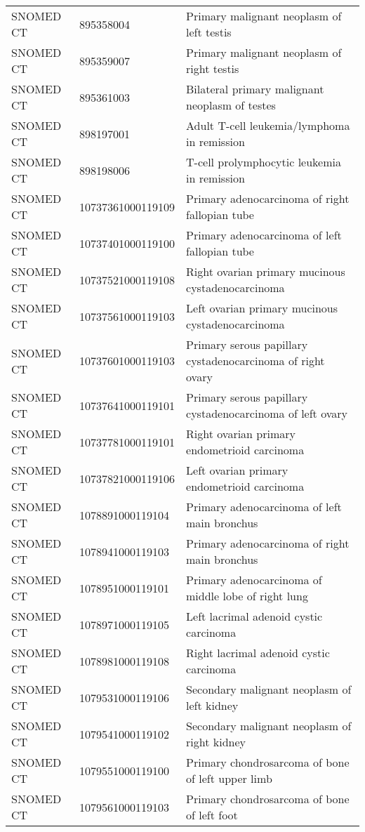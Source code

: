 \begin{longtable}{p{}p{}p{}}
  SNOMED CT & 895358004 & Primary malignant neoplasm of left testis \\ 
  SNOMED CT & 895359007 & Primary malignant neoplasm of right testis \\ 
  SNOMED CT & 895361003 & Bilateral primary malignant neoplasm of testes \\ 
  SNOMED CT & 898197001 & Adult T-cell leukemia/lymphoma in remission \\ 
  SNOMED CT & 898198006 & T-cell prolymphocytic leukemia in remission \\ 
  SNOMED CT & 10737361000119109 & Primary adenocarcinoma of right fallopian tube \\ 
  SNOMED CT & 10737401000119100 & Primary adenocarcinoma of left fallopian tube \\ 
  SNOMED CT & 10737521000119108 & Right ovarian primary mucinous cystadenocarcinoma \\ 
  SNOMED CT & 10737561000119103 & Left ovarian primary mucinous cystadenocarcinoma \\ 
  SNOMED CT & 10737601000119103 & Primary serous papillary cystadenocarcinoma of right ovary \\ 
  SNOMED CT & 10737641000119101 & Primary serous papillary cystadenocarcinoma of left ovary \\ 
  SNOMED CT & 10737781000119101 & Right ovarian primary endometrioid carcinoma \\ 
  SNOMED CT & 10737821000119106 & Left ovarian primary endometrioid carcinoma \\ 
  SNOMED CT & 1078891000119104 & Primary adenocarcinoma of left main bronchus \\ 
  SNOMED CT & 1078941000119103 & Primary adenocarcinoma of right main bronchus \\ 
  SNOMED CT & 1078951000119101 & Primary adenocarcinoma of middle lobe of right lung \\ 
  SNOMED CT & 1078971000119105 & Left lacrimal adenoid cystic carcinoma \\ 
  SNOMED CT & 1078981000119108 & Right lacrimal adenoid cystic carcinoma \\ 
  SNOMED CT & 1079531000119106 & Secondary malignant neoplasm of left kidney \\ 
  SNOMED CT & 1079541000119102 & Secondary malignant neoplasm of right kidney \\ 
  SNOMED CT & 1079551000119100 & Primary chondrosarcoma of bone of left upper limb \\ 
  SNOMED CT & 1079561000119103 & Primary chondrosarcoma of bone of left foot \\ 

\end{longtable}
